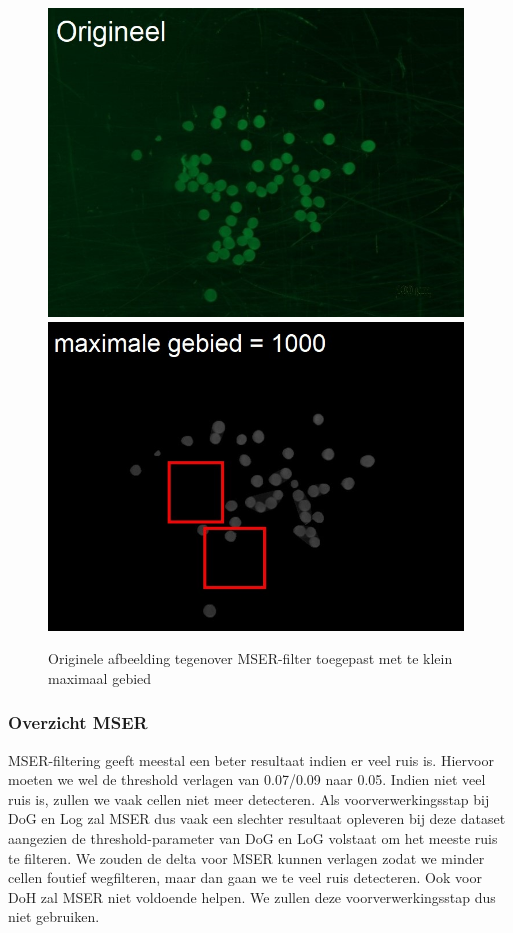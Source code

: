 \documentclass{article}
\begin{document}
\begin{multicols}{2}
\begin{figure}[H]
\centering
\includegraphics[width=0.98\textwidth]{images/delta_orig.jpg}
\includegraphics[width=0.98\textwidth]{images/max_area_1000.jpg}
\caption{\label{fig:max_area_mser}Originele afbeelding tegenover MSER-filter toegepast met te klein maximaal gebied}
\end{figure}

\subsubsection{Overzicht MSER}
MSER-filtering geeft meestal een beter resultaat indien er veel ruis is. Hiervoor moeten we wel de threshold verlagen van 0.07/0.09 naar 0.05. Indien niet veel ruis is, zullen we vaak cellen niet meer detecteren. Als voorverwerkingsstap bij DoG en Log zal MSER dus vaak een slechter resultaat opleveren bij deze dataset aangezien de threshold-parameter van DoG en LoG volstaat om het meeste ruis te filteren. We zouden de delta voor MSER kunnen verlagen zodat we minder cellen foutief wegfilteren, maar dan gaan we te veel ruis detecteren. Ook voor DoH zal MSER niet voldoende helpen. We zullen deze voorverwerkingsstap dus niet gebruiken.


\end{multicols}
\end{document}
